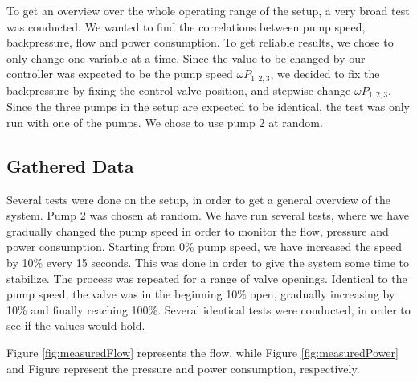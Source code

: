 To get an overview over the whole operating range of the setup,
a very broad test was conducted.
We wanted to find the correlations between pump speed, backpressure, flow and power consumption.
To get reliable results, we chose to only change one variable at a time.
Since the value to be changed by our controller was expected to be the pump speed $\omega P_{1,2,3}$,
we decided to fix the backpressure by fixing the control valve position,
and stepwise change $\omega P_{1,2,3}$.
Since the three pumps in the setup are expected to be identical,
the test was only run with one of the pumps.
We chose to use pump 2 at random.

\subsection{Gathered Data}
Several tests were done on the setup, in order to get a general overview of the system.
Pump 2 was chosen at random.
We have run several tests, where we have gradually changed the pump speed in order to monitor
the flow, pressure and power consumption.
Starting from 0\% pump speed, we have increased the speed by 10\% every 15 seconds. This was done
in order to give the system some time to stabilize. The process was repeated for a range of valve openings.
Identical to the pump speed, the valve was in the beginning 10\% open, gradually increasing by 10\% and
finally reaching 100\%.
Several identical tests were conducted, in order to see if the values would hold.

Figure \ref{fig:measuredFlow} represents the flow, while Figure \ref{fig:measuredPower}
and Figure represent the pressure and power consumption, respectively.

